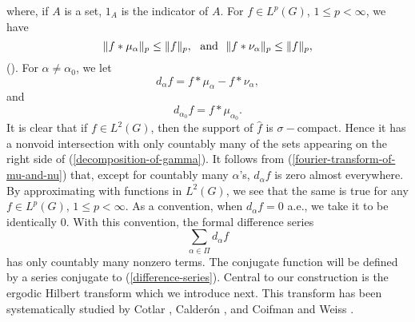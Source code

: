 where, if $A$ is a set, $1_A$ is the indicator of $A$.
For $f\in L^p(G)$, $1\leq p<\infty$, we have
$$\|f*\mu_\alpha\|_p\leq \|f\|_p,\ \ {\rm and}\ \ 
\|f*\nu_\alpha\|_p\leq \|f\|_p,$$
(\cite[Theorem (20.12)]{hr1}).
For $\alpha\neq\alpha_0$, we let
$$d_\alpha f=f*\mu_\alpha- f*\nu_\alpha,$$
and
$$d_{\alpha_0} f =f*\mu_{\alpha_0}.$$
It is clear that if $f\in L^2(G)$, then 
the support of $\widehat{f}$ is $\sigma-$compact.
Hence it has a nonvoid intersection with only 
countably many of the sets appearing on the right 
side of 
(\ref{decomposition-of-gamma}).  It follows from 
(\ref{fourier-transform-of-mu-and-nu}) that,
except for countably many $\alpha$'s,
$d_\alpha f$ is zero almost everywhere.
By approximating with functions in $L^2(G)$,
we see that the same is true for any $f\in L^p(G)$,
$1\leq p<\infty$.
As a convention, when $d_\alpha f=0$ a.e., we 
take it to be identically 0.  With this convention,
the formal difference series 
\begin{equation}
\sum_{\alpha\in \Pi} d_\alpha f
\label{difference-series}
\end{equation} 
has only countably many 
nonzero terms.
The conjugate function will be defined by a series
conjugate to (\ref{difference-series}).  
Central to our construction is the ergodic
Hilbert transform which we introduce next.
This transform has been systematically studied
by Cotlar \cite{cot}, Calder\'on \cite{cal},
and Coifman and Weiss \cite{cw}. 

